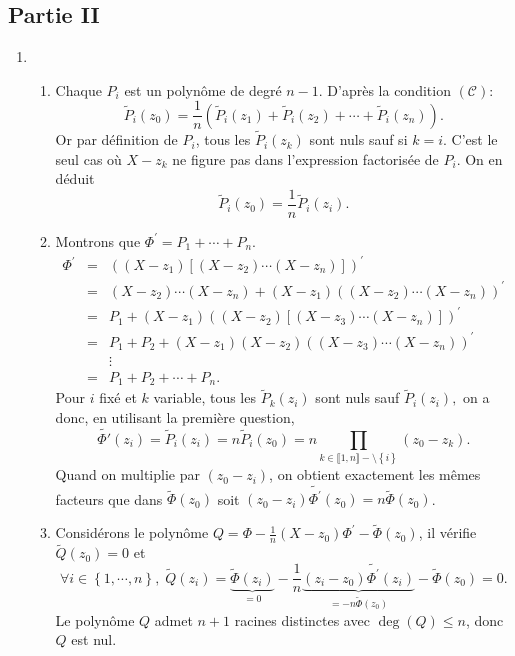 \subsection*{Partie II}
\begin{enumerate}
\item 
\begin{enumerate}
\item  Chaque $P_{i}$ est un polyn\^{o}me de degr\'{e} $n-1$. D'apr\`{e}s la
condition $(\mathcal{C})$:
\[
\widetilde{P}_{i}(z_{0})=\frac{1}{n}\left( \widetilde{P}_{i}(z_{1}) 
+ \widetilde{P}_{i}(z_{2})+\cdots +\widetilde{P}_{i}(z_{n})\right) .
\]
Or par d\'{e}finition de $P_{i}$, tous les $\widetilde{P}_{i}(z_{k})$ sont nuls sauf si $k=i$. C'est le seul cas o\`{u} $X-z_{k}$ ne figure pas dans
l'expression factoris\'{e}e de $P_{i}$. On en d\'{e}duit 
\[
\widetilde{P}_{i}(z_{0})=\frac{1}{n}\widetilde{P}_{i}(z_{i}). 
\]

\item  Montrons que $\Phi ^{\prime } = P_1 + \cdots + P_n$. 
\begin{eqnarray*}
\Phi ^{\prime } &=&\left( (X-z_{1})\left[ (X-z_{2})\cdots (X-z_{n})\right] \right) ^{\prime } \\
&=&(X-z_{2})\cdots (X-z_{n})+(X-z_{1})\left( (X-z_{2})\cdots (X-z_{n})\right) ^{\prime } \\
&=&P_{1}+(X-z_{1})\left( (X-z_{2})\left[ (X-z_{3})\cdots (X-z_{n})\right] \right) ^{\prime } \\
&=&P_{1}+P_{2}+(X-z_{1})(X-z_{2})\left( (X-z_{3})\cdots (X-z_{n})\right)^{\prime } \\
&&\vdots \\
&=&P_{1}+P_{2}+\cdots +P_{n}.
\end{eqnarray*}
Pour $i$ fix\'{e} et $k$ variable, tous les $\widetilde{P}_{k}(z_{i})$ sont nuls sauf $\widetilde{P}_{i}(z_{i}),$ on a donc, en utilisant la premi\`{e}re question, 
\[
\widetilde{\Phi '}(z_{i}) = \widetilde{P}_{i}(z_{i})=n\widetilde{P}_{i}(z_{0})
 = n\prod_{k\in \llbracket 1, n\rrbracket -\setminus \left\lbrace i \right\rbrace }(z_{0}-z_{k}) .
\]
Quand on multiplie par $(z_{0}-z_{i})$, on obtient exactement les m\^{e}mes facteurs que dans $\widetilde{\Phi }(z_{0})$ soit $(z_{0}-z_{i})\widetilde{\Phi ^{\prime }}(z_{0})=n\widetilde{\Phi }(z_{0})$.

\item  Consid\'{e}rons le polyn\^{o}me $Q=\Phi -\frac{1}{n}(X-z_{0})\Phi^{\prime }-\widetilde{\Phi }(z_{0})$, il v\'{e}rifie $\widetilde{Q}(z_{0})=0$ et 
\[
\forall i\in \left\{ 1,\cdots ,n\right\}, \;
\widetilde{Q}(z_{i})=
  \underbrace{\widetilde{\Phi}(z_{i})}_{=0}
-\frac{1}{n}
  \underbrace{(z_{i}-z_{0})\widetilde{\Phi ^{\prime }}(z_{i})}_{=-n\widetilde{\Phi }(z_{0})}-\widetilde{\Phi }(z_{0})=0 .
\]
Le polyn\^{o}me $Q$ admet $n+1$ racines distinctes avec $\deg(Q)\leq n$, donc $Q$ est nul.
\end{enumerate}


\end{enumerate}
